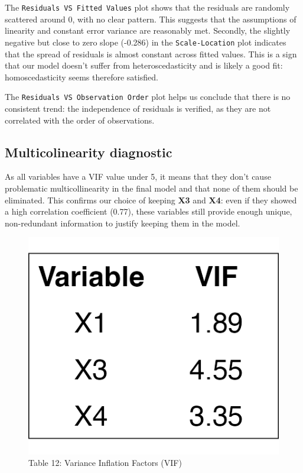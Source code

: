 \documentclass[
  12pt,
]{article}
\begin{document}
The \texttt{Residuals\ VS\ Fitted\ Values} plot shows that the residuals
are randomly scattered around 0, with no clear pattern. This suggests
that the assumptions of linearity and constant error variance are
reasonably met. Secondly, the slightly negative but close to zero slope
(-0.286) in the \texttt{Scale-Location} plot indicates that the spread
of residuals is almost constant across fitted values. This is a sign
that our model doesn't suffer from heteroscedasticity and is likely a
good fit: homoscedasticity seems therefore satisfied.

The \texttt{Residuals\ VS\ Observation\ Order} plot helps us conclude
that there is no consistent trend: the independence of residuals is
verified, as they are not correlated with the order of observations.

\vspace{-0.5em}

\subsection{Multicolinearity
diagnostic}\label{multicolinearity-diagnostic}

\noindent

\begin{minipage}{0.75\textwidth}
\vspace{-0.5em}
As all variables have a VIF value under 5, it means that they don’t cause problematic multicollinearity in the final model and that none of them should be eliminated. This confirms our choice of keeping \textbf{X3} and \textbf{X4}: even if they showed a high correlation coefficient (0.77), these variables still provide enough unique, non-redundant information to justify keeping them in the model.
\end{minipage}
\hfill
\begin{minipage}{0.2\textwidth}
\vspace{-3em}
  \begin{figure}[H]
    \centering
    \includegraphics[width=0.8\linewidth]{figures/vif_table.png}
    \vspace{-0.5em}
    \captionsetup{font=normalsize}
    \caption*{Table 12: Variance Inflation Factors (VIF)}
  \end{figure}
\end{minipage}
\end{document}
